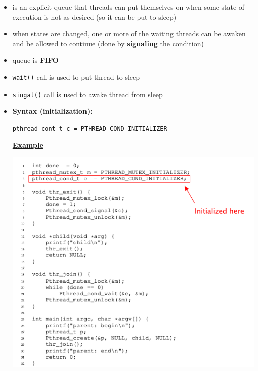 \documentclass[12pt]{article}
\begin{document}
\begin{enumerate}[1.]
\begin{enumerate}[a)]
\begin{itemize}
            \begin{itemize}
                \item is an explicit queue that threads can put themselves on when some
                state of execution is not as desired (so it can be put to sleep)
                \item when states are changed, one or more of the waiting threads can be
                awaken and be allowed to continue (done by \textbf{signaling} the condition)
                \item queue is \textbf{FIFO}
                \item \texttt{wait()} call is used to put thread to sleep
                \item \texttt{singal()} call is used to awake thread from sleep
                \item \textbf{Syntax (initialization):}

                \bigskip

                \texttt{pthread\_cont\_t c = PTHREAD\_COND\_INITIALIZER}

                \bigskip

                \underline{\textbf{Example}}

                \begin{center}
                \includegraphics[width=\linewidth]{images/midterm_2_solution_16.png}
                \end{center}


\end{itemize}
\end{itemize}
\end{enumerate}
\end{enumerate}
\end{document}
